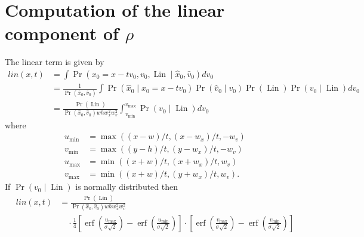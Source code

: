 \documentclass[12pt]{amsart}
\DeclareMathOperator{\Lin}{Lin}
\DeclareMathOperator{\erf}{erf}
\begin{document}
\section{Computation of the linear component of $\rho$}
The linear term is given by
\begin{align*}
	lin(x,t) &= \int \Pr( x_0 = x-t v_0, v_0, \Lin \mid \hat{x}_0, \hat{v}_0 ) dv_0 \\
	&= \frac{1}{ \Pr( \hat{x}_0, \hat{v}_0 ) } \int \Pr( \hat{x}_0 \mid x_0 = x-tv_0 ) \Pr( \hat{v}_0 \mid v_0 ) \Pr( \Lin ) \Pr( v_0 \mid \Lin)  dv_0 \\
	&= \frac{ \Pr(\Lin) }{ \Pr( \hat{x}_0 , \hat{v}_0 ) wh w_x^2 w_v^2 } \int_{v_{\min}}^{v_{\max}} \Pr(v_0 \mid \Lin ) dv_0
\end{align*}
where
\begin{align*}
	u_{\min} &= \max( (x-w)/t, (x-w_x)/t, -w_v ) \\
	v_{\min} &= \max( (y-h)/t, (y-w_x)/t, -w_v ) \\
	u_{\max} &=\min( (x+w)/t, (x+w_x)/t, w_v ) \\
	v_{\max} &=\min( (x+w)/t, (y+w_x)/t, w_v ).
\end{align*}
If $\Pr( v_0 \mid \Lin)$ is normally distributed then
\begin{align*}
	lin(x,t) &= \frac{ \Pr(\Lin) }{ \Pr( \hat{x}_0 , \hat{v}_0 ) wh w_x^2 w_v^2 } \\
	& \quad \cdot \frac{1}{4} \left[ \erf \left( \frac{ u_{\max} }{ \sigma \sqrt{2} } \right) - \erf \left( \frac{ u_{\min} }{ \sigma \sqrt{2} } \right) \right]
	\cdot \left[ \erf \left( \frac{ v_{\max} }{ \sigma \sqrt{2} } \right) - \erf \left( \frac{ v_{\min} }{ \sigma \sqrt{2} } \right) \right]
\end{align*}
\end{document}
